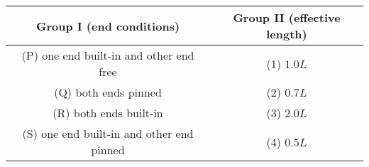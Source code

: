 \begin{tabular}[12pt]{ |c| c| } 
    \hline
    {Group I (end conditions)} & {Group II (effective length)}\\ 
    \hline
    (P) one end built-in and other end free & (1) $1.0L$\\
    \hline 
    (Q) both ends pinned & (2) $0.7L$ \\
    \hline
    (R) both ends built-in & (3) $2.0L$ \\
    \hline   
    (S) one end built-in and other end pinned & (4) $0.5L$\\
    \hline
\end{tabular}

